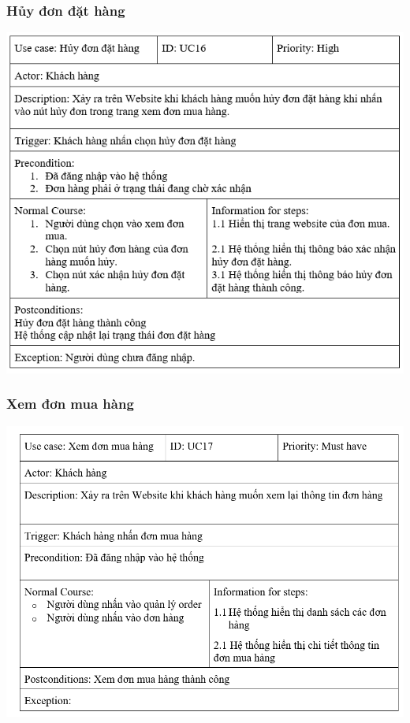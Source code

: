 \documentclass[12pt,a4paper,2sides]{report}
\begin{document}
\subsubsection{Hủy đơn đặt hàng}
    \includegraphics[width=1\linewidth]{lib/usecase/huydondat.png}\\\vspace*{1cm}
\subsubsection{Xem đơn mua hàng}
    \includegraphics[width=1\linewidth]{lib/usecase/khachxemdon.png}\\\vspace*{1cm}    
\end{document}
